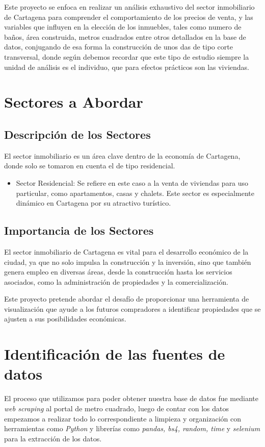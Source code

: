 \documentclass[12pt,a4paper]{article}
\begin{document}
Este proyecto se enfoca en realizar un análisis exhaustivo del sector inmobiliario de Cartagena para comprender el comportamiento de los precios de venta, y las variables que influyen en la elección de los inmuebles, tales como numero de baños, área construida, metros cuadrados entre otros detallados en la base de datos, conjugando de esa forma la construcción de unos das de tipo corte transversal, donde según \citep{rodriguez2018diseno} debemos recordar que este tipo de estudio siempre la unidad de análisis es el individuo, que para efectos prácticos son las viviendas.



\section{Sectores a Abordar}
\subsection{Descripción de los Sectores}
El sector inmobiliario es un área clave dentro de la economía de Cartagena, donde solo se tomaron en cuenta el de tipo residencial.
\begin{itemize}
	\item Sector Residencial: Se refiere en este caso a la venta de viviendas para uso particular, como apartamentos, casas y chalets. Este sector es especialmente dinámico en Cartagena por su atractivo turístico.
\end{itemize} 

\subsection{Importancia de los Sectores}
El sector inmobiliario de Cartagena es vital para el desarrollo económico de la ciudad, ya que no solo impulsa la construcción y la inversión, sino que también genera empleo en diversas áreas, desde la construcción hasta los servicios asociados, como la administración de propiedades y la comercialización.

Este proyecto pretende abordar el desafío de proporcionar una herramienta de visualización que ayude a los futuros compradores a identificar propiedades que se ajusten a sus posibilidades económicas.
\section{Identificación de las fuentes de datos}
El proceso que utilizamos para poder obtener nuestra base de datos fue mediante \textit{web scraping} al portal de metro cuadrado, luego de contar con los datos empezamos a realizar todo lo correspondiente a limpieza y organización con herramientas como \textit{Python} y librerías como \textit{pandas, bs4, random, time} y \textit{selenium} para la extracción de los datos.
\end{document}
